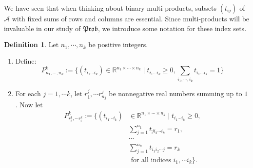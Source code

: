 \documentclass[a4paper]{amsproc}
\theoremstyle{plain}
\theoremstyle{definition}
\newtheorem{definition}[theorem]{Definition}
\theoremstyle{remark}
\numberwithin{equation}{section}
\newcommand{\Prob}{\mathfrak{Prob}}
\begin{document}
We have seen that when thinking about binary multi-products, subsets $(t_{ij})$ of $\mathcal{A}$ with fixed sums of rows and columns are essential. Since multi-products will be invaluable in our study of $\Prob$, we introduce some notation for these index sets.

\begin{definition}
    Let $n_1, \cdots, n_k$ be positive integers.
    \begin{enumerate}
        \item Define:
        \begin{equation*}
            P^k_{n_1,\cdots,n_k} := \{ (t_{i_1 \cdots i_k}) \in \mathbb{R}^{n_1 \times \cdots \times n_k} \mid t_{i_1 \cdots i_k} \geq 0, \sum_{i_1,\cdots,i_k} t_{i_1 \cdots i_k} = 1 \}
        \end{equation*}
        \item For each $j = 1, \cdots k$, let $r^j_1, \cdots r^j_{n_j}$ be nonnegative real numbers summing up to $1$. Now let
        \begin{equation*}
            \begin{split}
                P^k_{r_i^1,\cdots r_i^k} := \{ (t_{i_1 \cdots i_k}) &\in \mathbb{R}^{n_1 \times \cdots \times n_k} \mid t_{i_1 \cdots i_k} \geq 0, \\
                & \sum_{j=1}^{n_1} t_{j i_2 \cdots i_k} = r_1, \\
                & \cdots \\
                & \sum_{j=1}^{n_k} t_{i_1 i_2 \cdots j} = r_k \\
                & \text{ for all indices } i_1, \cdots i_k \} .
            \end{split}
        \end{equation*}
    \end{enumerate}
\end{definition}
\end{document}
